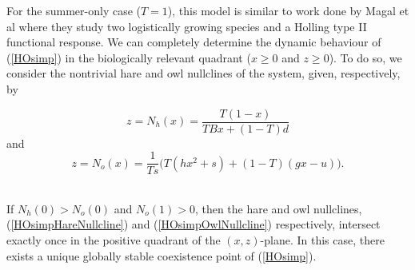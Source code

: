 \documentclass[12pt]{UOthesis}
\theoremstyle{remarkstyle}
\begin{document}
For the summer-only case ($T=1$), this model is similar to work done by Magal et al \cite{MagalCosnerRuanCasas} where they study two logistically growing species and a Holling type II functional response. We can completely determine the dynamic behaviour of (\ref{HOsimp}) in the biologically relevant quadrant ($x\ge 0$ and $z\ge 0$). To do so, we consider the nontrivial hare and owl nullclines of the system, given, respectively, by

\begin{equation}
	z=N_h(x)=\frac{T(1-x)}{TBx+(1-T)d}
	\label{HOsimpHareNullcline}
\end{equation}
and
\begin{equation}
	z=N_o(x)=\frac{1}{Ts}\Big(T(hx^2+s)+(1-T)(gx-u)\Big).
	\label{HOsimpOwlNullcline}
\end{equation}\\

\begin{theo}
	If $N_h(0)>N_o(0)$ and $N_o(1)>0$, then the hare and owl nullclines, (\ref{HOsimpHareNullcline}) and (\ref{HOsimpOwlNullcline}) respectively, intersect exactly once in the positive quadrant of the $(x,z)$-plane. In this case, there exists a unique globally stable coexistence point of (\ref{HOsimp}).
	\label{TheoHOSimpCoex}
\end{theo}
\end{document}
